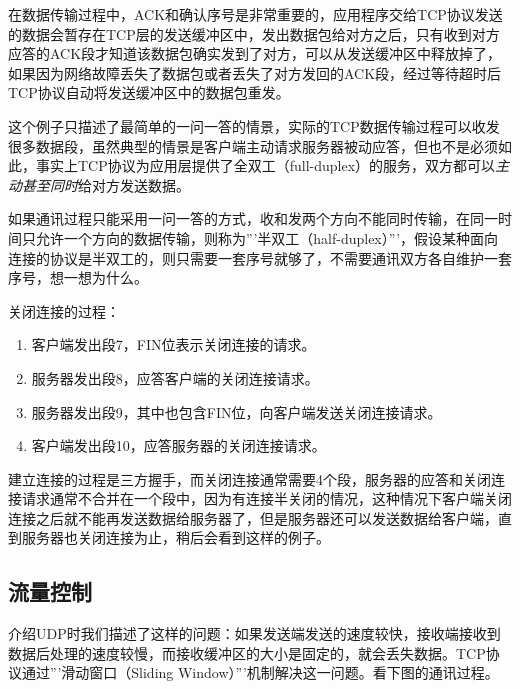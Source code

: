 在数据传输过程中，ACK和确认序号是非常重要的，应用程序交给TCP协议发送的数据会暂存在TCP层的发送缓冲区中，发出数据包给对方之后，只有收到对方应答的ACK段才知道该数据包确实发到了对方，可以从发送缓冲区中释放掉了，如果因为网络故障丢失了数据包或者丢失了对方发回的ACK段，经过等待超时后TCP协议自动将发送缓冲区中的数据包重发。



这个例子只描述了最简单的一问一答的情景，实际的TCP数据传输过程可以收发很多数据段，虽然典型的情景是客户端主动请求服务器被动应答，但也不是必须如此，事实上TCP协议为应用层提供了全双工（full-duplex）的服务，双方都可以\emph{主动甚至同时}给对方发送数据。



如果通讯过程只能采用一问一答的方式，收和发两个方向不能同时传输，在同一时间只允许一个方向的数据传输，则称为'''半双工（half-duplex）'''，假设某种面向连接的协议是半双工的，则只需要一套序号就够了，不需要通讯双方各自维护一套序号，想一想为什么。



关闭连接的过程：


\begin{enumerate}

\item 客户端发出段7，FIN位表示关闭连接的请求。

\item 服务器发出段8，应答客户端的关闭连接请求。

\item 服务器发出段9，其中也包含FIN位，向客户端发送关闭连接请求。

\item 客户端发出段10，应答服务器的关闭连接请求。
\end{enumerate}


建立连接的过程是三方握手，而关闭连接通常需要4个段，服务器的应答和关闭连接请求通常不合并在一个段中，因为有连接半关闭的情况，这种情况下客户端关闭连接之后就不能再发送数据给服务器了，但是服务器还可以发送数据给客户端，直到服务器也关闭连接为止，稍后会看到这样的例子。


\subsection{流量控制}
%


介绍UDP时我们描述了这样的问题：如果发送端发送的速度较快，接收端接收到数据后处理的速度较慢，而接收缓冲区的大小是固定的，就会丢失数据。TCP协议通过'''滑动窗口（Sliding Window）'''机制解决这一问题。看下图的通讯过程。


